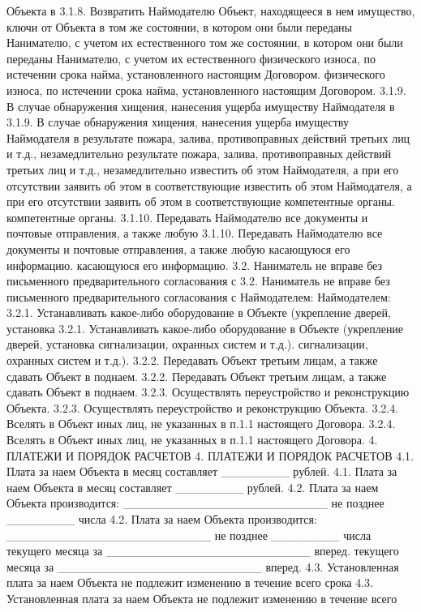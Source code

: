 Объекта в
3.1.8. Возвратить Наймодателю Объект, находящееся в нем имущество, ключи от
Объекта в
том же состоянии, в котором они были переданы Нанимателю, с учетом их
естественного
том же состоянии, в котором они были переданы Нанимателю, с учетом их
естественного
физического износа, по истечении срока найма, установленного настоящим
Договором.
физического износа, по истечении срока найма, установленного настоящим
Договором.
3.1.9. В случае обнаружения хищения, нанесения ущерба имуществу Наймодателя в
3.1.9. В случае обнаружения хищения, нанесения ущерба имуществу Наймодателя в
результате пожара, залива, противоправных действий третьих лиц и т.д.,
незамедлительно
результате пожара, залива, противоправных действий третьих лиц и т.д.,
незамедлительно
известить об этом Наймодателя, а при его отсутствии заявить об этом в
соответствующие
известить об этом Наймодателя, а при его отсутствии заявить об этом в
соответствующие
компетентные органы.
компетентные органы.
3.1.10. Передавать Наймодателю все документы и почтовые отправления, а также
любую
3.1.10. Передавать Наймодателю все документы и почтовые отправления, а также
любую
касающуюся его информацию.
касающуюся его информацию.
3.2. Наниматель не вправе без письменного предварительного согласования с
3.2. Наниматель не вправе без письменного предварительного согласования с
Наймодателем:
Наймодателем:
3.2.1. Устанавливать какое-либо оборудование в Объекте (укрепление дверей,
установка
3.2.1. Устанавливать какое-либо оборудование в Объекте (укрепление дверей,
установка
сигнализации, охранных систем и т.д.).
сигнализации, охранных систем и т.д.).
3.2.2. Передавать Объект третьим лицам, а также сдавать Объект в поднаем.
3.2.2. Передавать Объект третьим лицам, а также сдавать Объект в поднаем.
3.2.3. Осуществлять переустройство и реконструкцию Объекта.
3.2.3. Осуществлять переустройство и реконструкцию Объекта.
3.2.4. Вселять в Объект иных лиц, не указанных в п.1.1 настоящего Договора.
3.2.4. Вселять в Объект иных лиц, не указанных в п.1.1 настоящего Договора.
4. ПЛАТЕЖИ И ПОРЯДОК РАСЧЕТОВ
4. ПЛАТЕЖИ И ПОРЯДОК РАСЧЕТОВ
4.1. Плата за наем Объекта в месяц составляет ________ рублей.
4.1. Плата за наем Объекта в месяц составляет ________ рублей.
4.2. Плата за наем Объекта производится: ________________________ не позднее
________ числа
4.2. Плата за наем Объекта производится: ________________________ не позднее
________ числа
текущего месяца за ________________________ вперед.
текущего месяца за ________________________ вперед.
4.3. Установленная плата за наем Объекта не подлежит изменению в течение всего
срока
4.3. Установленная плата за наем Объекта не подлежит изменению в течение всего

